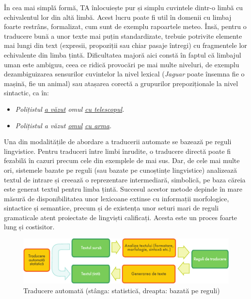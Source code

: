 \begin{multicols}{2}
În cea mai simplă formă, TA înlocuiește pur și simplu cuvintele \mbox{dintr-o} limbă cu echivalentul lor din altă limbă. Acest lucru poate fi util în domenii cu limbaj foarte restrâns, formalizat, cum sunt de exemplu rapoartele meteo. Însă, pentru o traducere bună a unor texte mai puțin standardizate, trebuie potrivite elemente mai lungi din text (expresii, propoziții sau chiar pasaje întregi) cu fragmentele lor echivalente din limba țintă. Dificultatea majoră aici constă în faptul că limbajul uman este ambiguu, ceea ce ridică provocări pe mai multe niveluri, de exemplu dezambiguizarea sensurilor cuvintelor la nivel lexical (\textit{Jaguar} poate însemna fie o mașină, fie un animal) sau atașarea corectă a grupurilor prepoziționale la nivel sintactic, ca în:

\begin{itemize}
\item \textit{Polițistul \underline{a văzut} omul \underline{cu telescopul}.}
\item \textit{Polițistul a văzut \underline{omul} \underline{cu arma}.}
\end{itemize}

Una din modalitățile de abordare a traducerii automate se bazează pe reguli lingvistice. Pentru traduceri între limbi înrudite, o traducere directă poate fi fezabilă în cazuri precum cele din exemplele de mai sus. Dar, de cele mai multe ori, sistemele bazate pe reguli (sau bazate pe cunoștințe lingvistice) analizează textul de intrare și creează o reprezentare intermediară, simbolică, pe baza căreia este generat textul pentru limba țintă. Succesul acestor metode depinde în mare măsură de disponibilitatea unor lexicoane extinse cu informații morfologice, sintactice și semantice, precum și de existența unor seturi mari de reguli gramaticale atent proiectate de lingviști calificați. Acesta este un proces foarte lung și costisitor.

\begin{figure}[htb]
\center
\includegraphics[width=\textwidth]{../_media/romanian/machine_translation}
\caption{Traducere automată (stânga: statistică, dreapta: bazată pe reguli)}
\label{fig:mtarch_de}
\vspace{-15mm}
\end{figure}


\end{multicols}
